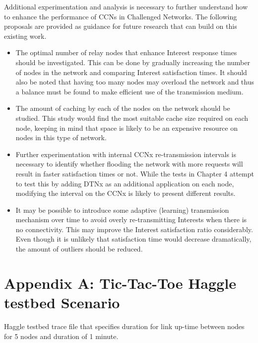 \documentclass[a4paper,12pt]{report}      %
\begin{document}
Additional experimentation and analysis is necessary to further understand how to enhance the performance of CCNs in Challenged Networks. The following proposals are provided as guidance for future research that can build on this existing work.

\begin{itemize}
\item The optimal number of relay nodes that enhance Interest response times should be investigated. This can be done by gradually increasing the number of nodes in the network and comparing Interest satisfaction times. It should also be noted that having too many nodes may overload the network and thus a balance must be found to make efficient use of the transmission medium.

\item The amount of caching by each of the nodes on the network should be studied. This study would find the most suitable cache size required on each node, keeping in mind that space is likely to be an expensive resource on nodes in this type of network.

\item Further experimentation with internal CCNx re-transmission intervals is necessary to identify whether flooding the network with more requests will result in faster satisfaction times or not. While the tests in Chapter 4 attempt to test this by adding DTNx as an additional application on each node, modifying the interval on the CCNx is likely to present different results.

\item It may be possible to introduce some adaptive (learning) transmission mechanism over time to avoid
overly re-transmitting Interests when there is no connectivity. This may improve the Interest satisfaction ratio considerably. Even though it is unlikely that satisfaction time would decrease dramatically, the amount of outliers should be reduced.

\end{itemize}

\clearpage
{}


\pagebreak
\chapter{Appendix A: Tic-Tac-Toe Haggle testbed Scenario}

Haggle testbed trace file that specifies duration for link up-time between nodes for 5 nodes and
duration of 1 minute.
\end{document}
